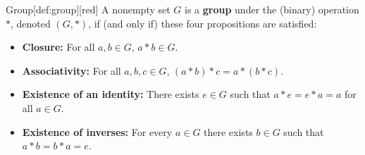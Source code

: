 \newpage
\begin{define}{Group}[def:group][red]
  A nonempty set \(G\) is a \textbf{group} under the (binary) operation \(*\), 
  denoted \((G, *)\), if (and only if) these four propositions are satisfied:
  \begin{itemize}
    \item \textbf{Closure:} For all \(a, b \in G\), \(a * b \in G\).
    \item \textbf{Associativity:} For all \(a, b, c \in G\), \((a * b) * c = a * (b * c)\).
    \item \textbf{Existence of an identity:} There exists \(e \in G\) such that \(a * e = e * a = a\) for all \(a \in G\).
    \item \textbf{Existence of inverses:} For every \(a \in G\) there exists \(b \in G\) such that \(a * b = b * a = e\).
  \end{itemize}
\end{define}
